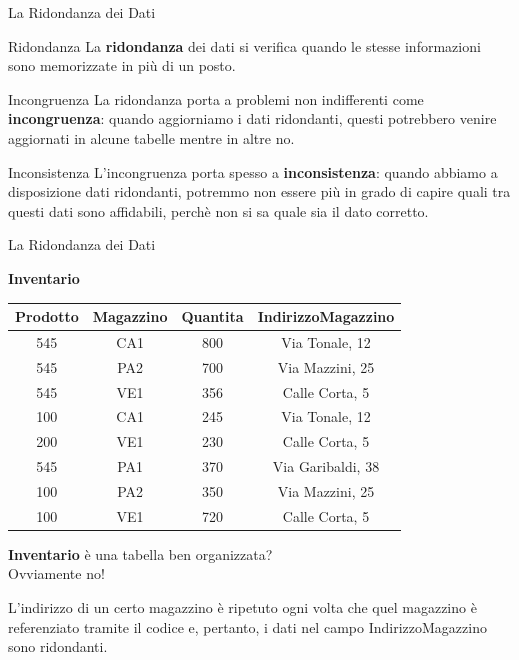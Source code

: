 \begin{frame}{La Ridondanza dei Dati}
\begin{minipage}{0.9\textwidth}
    \begin{block}{Ridondanza}
        La \textbf{ridondanza} dei dati si verifica quando le stesse informazioni sono memorizzate in pi\`u di un posto.
    \end{block}
\end{minipage}
\pause
    \begin{block}{Incongruenza}
        La ridondanza porta a problemi non indifferenti come \textbf{incongruenza}: quando aggiorniamo i dati ridondanti, questi potrebbero venire aggiornati in alcune tabelle mentre in altre no.
    \end{block}
\pause
    \begin{block}{Inconsistenza}
        L'incongruenza porta spesso a \textbf{inconsistenza}: quando abbiamo a disposizione dati ridondanti, potremmo non essere pi\`u in grado di capire quali tra questi dati sono affidabili, perch\`e non si sa quale sia il dato corretto.
    \end{block}
\end{frame}
%
\begin{frame}{La Ridondanza dei Dati}
\begin{minipage}[t]{0.55\linewidth}
    \begin{center}
        \textbf{Inventario}
        
        \begin{tabular}{|c|c|c|c|}
            \hline
            \rowcolor{cyan!30}Prodotto & Magazzino & Quantita & IndirizzoMagazzino \\
            \hline
            545 & CA1 & 800 & Via Tonale, 12 \\ \hline
            545 & PA2 & 700 & Via Mazzini, 25 \\ \hline
            545 & VE1 & 356 & Calle Corta, 5 \\ \hline
            100 & CA1 & 245 & Via Tonale, 12 \\ \hline
            200 & VE1 & 230 & Calle Corta, 5 \\ \hline
            545 & PA1 & 370 & Via Garibaldi, 38 \\ \hline
            100 & PA2 & 350 & Via Mazzini, 25 \\ \hline
            100 & VE1 & 720 & Calle Corta, 5 \\ \hline
        \end{tabular}
    \end{center}
\end{minipage}%
\hfill%
\begin{minipage}[t]{0.35\linewidth}
    \textbf{Inventario} \`e una tabella ben organizzata?
    \pause
    \newline
    \\Ovviamente no!
    
    L'indirizzo di un certo magazzino \`e ripetuto ogni volta che quel magazzino \`e referenziato tramite il codice e, pertanto, i dati nel campo IndirizzoMagazzino sono ridondanti.
\end{minipage}
    
\end{frame}
